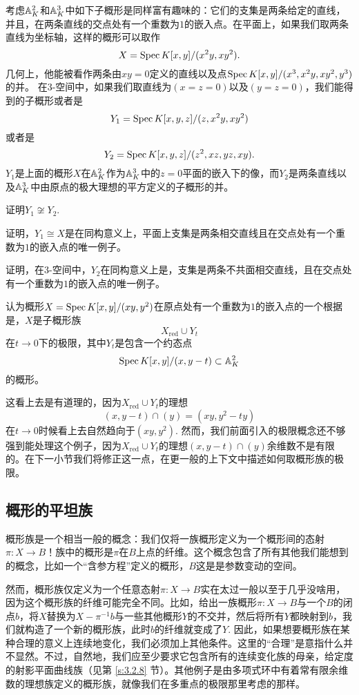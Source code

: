 考虑$\mathbb{A}_K^2$和$\mathbb{A}_K^3$中如下子概形是同样富有趣味的：它们的支集是两条给定的直线，并且，在两条直线的交点处有一个重数为$1$的嵌入点。在平面上，如果我们取两条直线为坐标轴，这样的概形可以取作
\[
	X=\operatorname{Spec} K[x,y]/(x^2y,xy^2).
\]
几何上，他能被看作两条由$xy=0$定义的直线以及点$\operatorname{Spec} K[x,y]/(x^3,x^2y,xy^2,y^3)$的并。 在$3$\hyp 空间中，如果我们取直线为$(x=z=0)$以及$(y=z=0)$，我们能得到的子概形或者是
\[
	Y_1=\operatorname{Spec} K[x,y,z]/(z,x^2y,xy^2)
\]
或者是
\[
	Y_2=\operatorname{Spec} K[x,y,z]/(z^2,xz,yz,xy).
\]
$Y_1$是上面的概形$X$在$\mathbb{A}_K^2$作为$\mathbb{A}_K^3$中的$z=0$平面的嵌入下的像，而$Y_2$是两条直线以及$\mathbb{A}_K^3$中由原点的极大理想的平方定义的子概形的并。

\begin{exe}
	证明$Y_1\not\cong Y_2$.
	\begin{compactenum}[(a)]
		\item 证明，$Y_1\cong X$是在同构意义上，平面上支集是两条相交直线且在交点处有一个重数为$1$的嵌入点的唯一例子。
		\item 证明，在$3$\hyp 空间中，$Y_2$在同构意义上是，支集是两条不共面相交直线，且在交点处有一个重数为$1$的嵌入点的唯一例子。
	\end{compactenum}
\end{exe}

认为概形$X=\operatorname{Spec} K[x,y]/(xy,y^2)$在原点处有一个重数为$1$的嵌入点的一个根据是，$X$是子概形族
\[
	X_{\text{red}}\cup Y_t
\]
在$t\to 0$下的极限，其中$Y_t$是包含一个约态点
\[
	\operatorname{Spec} K[x,y]/(x,y-t)\subset \mathbb{A}_K^2
\]
的概形。

这看上去是有道理的，因为$X_{\text{red}}\cup Y_t$的理想
\[
	(x,y-t)\cap (y)=(xy,y^2-ty)
\]
在$t\to 0$时候看上去自然趋向于$(xy,y^2)$. 然而，我们前面引入的极限概念还不够强到能处理这个例子，因为$X_{\text{red}}\cup Y_t$的理想$(x,y-t)\cap(y)$余维数不是有限的。在下一小节我们将修正这一点，在更一般的上下文中描述如何取概形族的极限。

\subsection{概形的平坦族}\label{s:2.3.4}

概形族是一个相当一般的概念：我们仅将一族概形定义为一个概形间的态射$\pi:X\to B$！族中的概形是$\pi$在$B$上点的纤维。这个概念包含了所有其他我们能想到的概念，比如一个“含参方程”定义的概形，$B$这是是参数变动的空间。

然而，概形族仅定义为一个任意态射$\pi:X\to B$实在太过一般以至于几乎没啥用，因为这个概形族的纤维可能完全不同。比如，给出一族概形$\pi:X\to B$与一个$B$的闭点$b$，将$X$替换为$X-\pi^{-1}b$与一些其他概形$Y$的不交并，然后将所有$Y$都映射到$b$，我们就构造了一个新的概形族，此时$b$的纤维就变成了$Y$. 因此，如果想要概形族在某种合理的意义上连续地变化，我们必须加上其他条件。这里的“合理”是意指什么并不显然。不过，自然地，我们应至少要求它包含所有的连续变化族的母亲，给定度的射影平面曲线族（见第 \ref{s:3.2.8} 节）。其他例子是由多项式环中有着常有限余维数的理想族定义的概形族，就像我们在多重点的极限那里考虑的那样。

